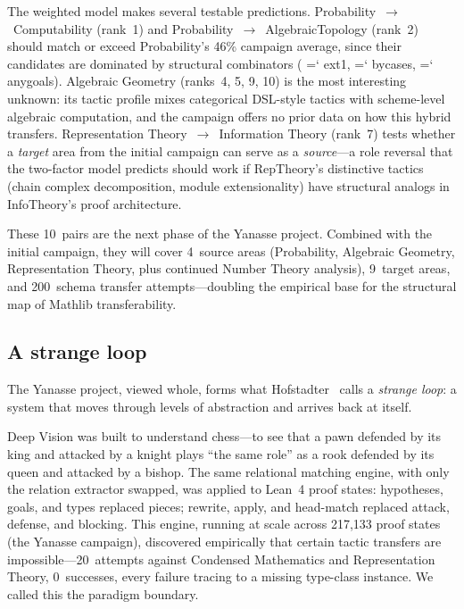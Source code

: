 \documentclass[11pt]{article}
\renewcommand{\texttt}[1]{%
  \begingroup\ttfamily\hyphenchar\font=`\-\relax
  \def\_{\textunderscore\discretionary{}{}{}}%
  #1\endgroup}
\theoremstyle{definition}
\theoremstyle{remark}
\begin{document}
\noindent The weighted model makes several testable predictions.
Probability~$\to$~Computability (rank~1) and
Probability~$\to$~AlgebraicTopology (rank~2) should match or exceed
Probability's 46\% campaign average, since their candidates are
dominated by structural combinators (\texttt{ext1},
\texttt{by\_cases}, \texttt{any\_goals}).
Algebraic Geometry (ranks~4, 5, 9, 10) is the most interesting
unknown: its tactic profile mixes categorical DSL-style tactics
with scheme-level algebraic computation, and the campaign offers
no prior data on how this hybrid transfers.
Representation Theory~$\to$~Information Theory (rank~7) tests
whether a \emph{target} area from the initial campaign can serve
as a \emph{source}---a role reversal that the two-factor model
predicts should work if RepTheory's distinctive tactics (chain
complex decomposition, module extensionality) have structural
analogs in InfoTheory's proof architecture.

These 10~pairs are the next phase of the Yanasse project.  Combined
with the initial campaign, they will cover 4~source areas
(Probability, Algebraic Geometry, Representation Theory, plus
continued Number Theory analysis),
9~target areas, and 200~schema transfer attempts---doubling the
empirical base for the structural map of Mathlib transferability.

\subsection*{A strange loop}

The Yanasse project, viewed whole, forms what
Hofstadter~\cite{hofstadter_go_1999, hofstadter2007loop,
hofstadter_surfaces_2013}
calls a \emph{strange loop}: a system that moves through levels of
abstraction and arrives back at itself.

Deep Vision was built to understand chess---to see that a pawn
defended by its king and attacked by a knight plays ``the same
role'' as a rook defended by its queen and attacked by a bishop.
The same relational matching engine, with only the relation
extractor swapped, was applied to Lean~4 proof states: hypotheses,
goals, and types replaced pieces; rewrite, apply, and head-match
replaced attack, defense, and blocking.  This engine, running at
scale across 217{,}133 proof states (the Yanasse campaign),
discovered empirically that certain tactic transfers are
impossible---20~attempts against Condensed Mathematics and
Representation Theory, 0~successes, every failure tracing to a
missing type-class instance.  We called this the paradigm boundary.
\end{document}
